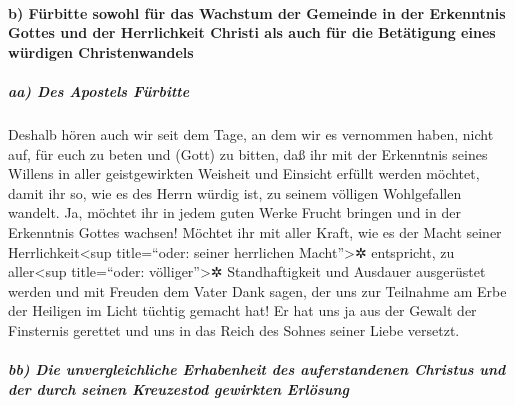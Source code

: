\hypertarget{b-fuxfcrbitte-sowohl-fuxfcr-das-wachstum-der-gemeinde-in-der-erkenntnis-gottes-und-der-herrlichkeit-christi-als-auch-fuxfcr-die-betuxe4tigung-eines-wuxfcrdigen-christenwandels}{%
\paragraph{b) Fürbitte sowohl für das Wachstum der Gemeinde in der
Erkenntnis Gottes und der Herrlichkeit Christi als auch für die
Betätigung eines würdigen
Christenwandels}\label{b-fuxfcrbitte-sowohl-fuxfcr-das-wachstum-der-gemeinde-in-der-erkenntnis-gottes-und-der-herrlichkeit-christi-als-auch-fuxfcr-die-betuxe4tigung-eines-wuxfcrdigen-christenwandels}}

\hypertarget{aa-des-apostels-fuxfcrbitte}{%
\subparagraph{aa) Des Apostels
Fürbitte}\label{aa-des-apostels-fuxfcrbitte}}

 Deshalb hören auch wir seit dem Tage, an dem wir es
vernommen haben, nicht auf, für euch zu beten und (Gott) zu bitten, daß
ihr mit der Erkenntnis seines Willens in aller geistgewirkten Weisheit
und Einsicht erfüllt werden möchtet,  damit ihr so, wie
es des Herrn würdig ist, zu seinem völligen Wohlgefallen wandelt. Ja,
möchtet ihr in jedem guten Werke Frucht bringen und in der Erkenntnis
Gottes wachsen!  Möchtet ihr mit aller Kraft, wie es der
Macht seiner Herrlichkeit\textless sup title=``oder: seiner herrlichen
Macht''\textgreater✲ entspricht, zu aller\textless sup title=``oder:
völliger''\textgreater✲ Standhaftigkeit und Ausdauer ausgerüstet werden
 und mit Freuden dem Vater Dank sagen, der uns zur
Teilnahme am Erbe der Heiligen im Licht tüchtig gemacht hat!
 Er hat uns ja aus der Gewalt der Finsternis gerettet und
uns in das Reich des Sohnes seiner Liebe versetzt.

\hypertarget{bb-die-unvergleichliche-erhabenheit-des-auferstandenen-christus-und-der-durch-seinen-kreuzestod-gewirkten-erluxf6sung}{%
\subparagraph{bb) Die unvergleichliche Erhabenheit des auferstandenen
Christus und der durch seinen Kreuzestod gewirkten
Erlösung}\label{bb-die-unvergleichliche-erhabenheit-des-auferstandenen-christus-und-der-durch-seinen-kreuzestod-gewirkten-erluxf6sung}}

